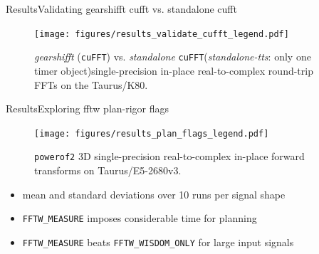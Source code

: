 \documentclass[t,11pt,hyperref={
  pdftitle = {gearshifft},
  pdfsubject = {gearshifft},
  pdfborder={0 0 0},
  colorlinks=true,
  urlcolor=red,
  citecolor=red,
  linkcolor=red,
  pdfauthor={Peter Steinbach, Matthias Werner}
  }
]{beamer}
\newcommand{\cufft}{\texttt{cuFFT}}
\newcommand{\mc}[1]{\lstinline!#1!}
\begin{document}
\begin{frame}{Results}{Validating gearshifft cufft vs. standalone cufft}
\begin{figure}[!htb]
  \centering
  \texttt{[image: figures/results\_validate\_cufft\_legend.pdf]}\\[-.5em]
  \hfill
  \caption{\textit{gearshifft} (\cufft{}) vs. \textit{standalone} \cufft{}\newline(\textit{standalone-tts}: only one timer object)\newline single-precision in-place real-to-complex round-trip FFTs on the Taurus/K80.}
  \label{fig:verify_cufft}
\end{figure}
\end{frame}


\begin{frame}{Results}{Exploring fftw plan-rigor flags}
\begin{figure}[!htbp]\vspace{-1em}
  \centering
  \texttt{[image: figures/results\_plan\_flags\_legend.pdf]}\\[-.5em]
  \hfill
  \caption{\texttt{powerof2} 3D single-precision real-to-complex in-place forward transforms on Taurus/E5-2680v3.}
  \label{fig:fftw_plan_flags}
\end{figure}
\pause
\vspace{-1em}
\begin{itemize}
\item mean and standard deviations over 10 runs per signal shape
\item \mc{FFTW_MEASURE} imposes considerable time for planning
\item \mc{FFTW_MEASURE} beats \mc{FFTW_WISDOM_ONLY} for large input signals
\end{itemize}
\end{frame}
\end{document}
